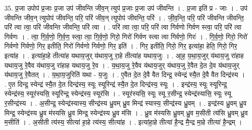 \documentclass[17pt]{extarticle}
\begin{document}
35. प्र॒जा उपोप॑ प्र॒जाः प्र॒जा उप॑ जीवन्ति जीव॒न् त्युप॑ प्र॒जाः प्र॒जा उप॑ जीवन्ति । . प्र॒जा इति॑ प्र - जाः । . उप॑ जीवन्ति जीव॒न् त्युपोप॑ जीवन्ति॒ परि॒ परि॑ जीव॒न् त्युपोप॑ जीवन्ति॒ परि॑ । . जी॒व॒न्ति॒ परि॒ परि॑ जीवन्ति जीवन्ति॒ परि॑ त्वा त्वा॒ परि॑ जीवन्ति जीवन्ति॒ परि॑ त्वा । . परि॑ त्वा त्वा॒ परि॒ परि॑ त्वा गिर्वणो गिर्वण स्त्वा॒ परि॒ परि॑ त्वा गिर्वणः । . त्वा॒ गि॒र्व॒णो॒ गि॒र्व॒ण॒ स्त्वा॒ त्वा॒ गि॒र्व॒णो॒ गिरो॒ गिरो॑ गिर्वण स्त्वा त्वा गिर्वणो॒ गिरः॑ । . गि॒र्व॒णो॒ गिरो॒ गिरो॑ गिर्वणो गिर्वणो॒ गिर॒ इतीति॒ गिरो॑ गिर्वणो गिर्वणो॒ गिर॒ इति॑ । . गिर॒ इतीति॒ गिरो॒ गिर॒ इत्या॑हा॒ हेति॒ गिरो॒ गिर॒ इत्या॑ह । . इत्या॑हा॒हे तीत्या॑ह यथाय॒जुर् य॑थाय॒जु रा॒हे तीत्या॑ह यथाय॒जुः । . आ॒ह॒ य॒था॒य॒जुर् य॑थाय॒जु रा॑हाह यथाय॒जु रे॒वैव य॑थाय॒जु रा॑हाह यथाय॒जु रे॒व । . य॒था॒य॒जु रे॒वैव य॑थाय॒जुर् य॑थाय॒जु रे॒वैत दे॒त दे॒व य॑थाय॒जुर् य॑थाय॒जु रे॒वैतत् । . य॒था॒य॒जुरिति॑ यथा - य॒जुः । . ए॒वैत दे॒त दे॒वै वैत दिन्द्र॒ स्येन्द्र॑ स्यै॒त दे॒वै वैत दिन्द्र॑स्य । . ए॒त दिन्द्र॒ स्येन्द्र॑ स्यै॒त दे॒त दिन्द्र॑स्य॒ स्यूः स्यूरिन्द्र॑ स्यै॒त दे॒त दिन्द्र॑स्य॒ स्यूः । . इन्द्र॑स्य॒ स्यूः स्यूरिन्द्र॒ स्येन्द्र॑स्य॒ स्यूर॑स्यसि॒ स्यूरिन्द्र॒ स्येन्द्र॑स्य॒ स्यूर॑सि । . स्यूर॑स्यसि॒ स्यूः स्यू र॒सीन्द्र॒ स्येन्द्र॑स्यासि॒ स्यूः स्यू र॒सीन्द्र॑स्य । . अ॒सीन्द्र॒ स्येन्द्र॑स्यास्य॒ सीन्द्र॑स्य ध्रु॒वम् ध्रु॒व मिन्द्र॑ स्यास्य॒ सीन्द्र॑स्य ध्रु॒वम् । . इन्द्र॑स्य ध्रु॒वम् ध्रु॒व मिन्द्र॒ स्येन्द्र॑स्य ध्रु॒व म॑स्यसि ध्रु॒व मिन्द्र॒ स्येन्द्र॑स्य ध्रु॒व म॑सि । . ध्रु॒व म॑स्यसि ध्रु॒वम् ध्रु॒व म॒सीती त्य॑सि ध्रु॒वम् ध्रु॒व म॒सीति॑ । . अ॒सीती त्य॑स्य॒ सीत्या॑ हा॒हे त्य॑स्य॒ सीत्या॑ह । . इत्या॑हा॒हे तीत्या॑ है॒न्द्र मै॒न्द्र मा॒हे तीत्या॑ है॒न्द्रम् । \newline
\end{document}
